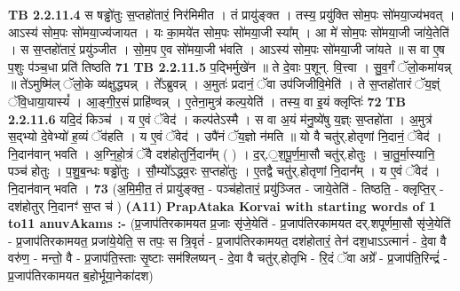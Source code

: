 \documentclass[17pt]{extarticle}
\begin{document}
                                \textbf{ TB 2.2.11.4} \newline
                  स षड्ढो॑तुः स॒प्तहो॑तारं॒ निर॑मिमीत । तं प्रायु॑ङ्क्त । तस्य॒ प्रयु॑क्ति सोम॒पः सो॑मया॒ज्य॑भवत् । आऽस्य॑ सोम॒पः सो॑मया॒ज्य॑जायत । यः का॒मये॑त सोम॒पः सो॑मया॒जी स्या᳚म् । आ मे॑ सोम॒पः सो॑मया॒जी जा॑ये॒तेति॑ । स स॒प्तहो॑तारं॒ प्रयु॑ञ्जीत । सो॒म॒प ए॒व सो॑मया॒जी भ॑वति । आऽस्य॑ सोम॒पः सो॑मया॒जी जा॑यते ॥ स वा ए॒ष प॒शुः प॑ञ्च॒धा प्रति॑ तिष्ठति \textbf{ 71} \newline
                  \newline
                                \textbf{ TB 2.2.11.5} \newline
                  प॒द्भिर्मुखे॑न ॥ ते दे॒वाः प॒शून्. वि॒त्त्वा । सु॒व॒र्गं ॅलो॒कमा॑यन्न् ॥ ते॑ऽमुष्मि॑ल् ॅलो॒के व्य॑क्षुद्ध्यन्न् । ते᳚ऽब्रुवन्न् । अ॒मुतः॑ प्रदानं॒ ॅवा उप॑जिजीवि॒मेति॑ । ते स॒प्तहो॑तारं ॅय॒ज्ञ्ं ॅवि॒धाया॒यास्यं᳚ । आ॒ङ्गी॒र॒सं प्राहि॑ण्वन्न् । ए॒तेना॒मुत्र॑ कल्प॒येति॑ । तस्य॒ वा इ॒यं क्लृप्तिः॑ \textbf{ 72} \newline
                  \newline
                                \textbf{ TB 2.2.11.6} \newline
                  यदि॒दं किञ्च॑ । य ए॒वं ॅवेद॑ । कल्प॑तेऽस्मै । स वा अ॒यं म॑नु॒ष्ये॑षु य॒ज्ञ्ः स॒प्तहो॑ता । अ॒मुत्र॑ स॒द्भ्यो दे॒वेभ्यो॑ ह॒व्यं ॅव॑हति । य ए॒वं ॅवेद॑ । उपै॑नं ॅय॒ज्ञो न॑मति ॥ यो वै चतु॑र्.होतृणां नि॒दानं॒ ॅवेद॑ । नि॒दान॑वान् भवति । अ॒ग्नि॒हो॒त्रं ॅवै दश॑होतुर्नि॒दान᳚म् ( ) । द॒र्.॒श॒पू॒र्ण॒मा॒सौ चतु॑र्.होतुः । चा॒तु॒र्मा॒स्यानि॒ पञ्च॑ होतुः । प॒शु॒ब॒न्धः षड्ढो॑तुः । सौ॒म्यो᳚ऽद्ध्व॒रः स॒प्तहो॑तुः । ए॒तद्वै चतु॑र्.होतृणां नि॒दान᳚म् । य ए॒वं ॅवेद॑ । नि॒दान॑वान् भवति । \textbf{ 73} \newline
                  \newline
                                    (अ॒मि॒मी॒त॒ तं प्रायु॑ङ्क्त॒ - पञ्च॑होतारं॒ प्रयु॑ञ्जित - जाये॒तेति॑ - तिष्ठति॒ - क्लृप्ति॒र् - दश॑होतुर् नि॒दानꣳ॑ स॒प्त च॑ ) \textbf{(A11)} \newline \newline
                \textbf{PrapAtaka Korvai with starting  words of 1 to11 anuvAkams :-} \newline
        (प्र॒जाप॑तिरकामयत प्र॒जाः सृ॑जे॒येति॑ - प्र॒जाप॑तिरकामयत दर्.शपूर्णमा॒सौ सृ॑जे॒येति॑ - प्र॒जाप॑तिरकामयत॒ प्रजा॑ये॒येति॒ स तपः॒ स त्रि॒वृतं॑ - प्र॒जाप॑तिरकामयत॒ दश॑होतारं॒ तेन॑ दश॒धाऽऽत्मानं॑ - दे॒वा वै वरु॑ण॒ - मन्तो॒ वै - प्र॒जाप॑ति॒स्ताः सृ॒ष्टाः सम॑श्लिष्यन् - दे॒वा वै चतु॑र्.होतृभि - रि॒दं ॅवा अग्रे᳚ - प्र॒जाप॑ति॒रिन्द्रं॑ - प्र॒जाप॑तिरकामयत ब॒होर्भूया॒नेका॑दश) \newline
\end{document}
